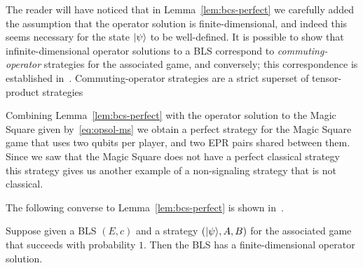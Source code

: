 \begin{remark}
The reader will have noticed that in Lemma~\ref{lem:bcs-perfect} we carefully added the assumption that the operator solution is finite-dimensional, and indeed this seems necessary for the state $|\psi\rangle$ to be well-defined. It is possible to show that infinite-dimensional operator solutions to a BLS correspond to \emph{commuting-operator} strategies for the associated game, and conversely; this correspondence is established in~\cite{cleve2017perfect}. Commuting-operator strategies are a strict superset of tensor-product strategies  
\end{remark}

Combining Lemma~\ref{lem:bcs-perfect} with the operator solution to the Magic Square given by~\eqref{eq:opsol-ms} we obtain a perfect strategy for the Magic Square game that uses two qubits per player, and two EPR pairs shared between them. Since we saw that the Magic Square does not have a perfect classical strategy this strategy gives us another example of a non-signaling strategy that is not classical. 

The following converse to Lemma~\ref{lem:bcs-perfect} is shown in~\cite{cleve2014characterization}. 

\begin{lemma}\label{lem:bcs-tensor}
Suppose given a BLS $(E,c)$ and a strategy $(|\psi\rangle,A,B)$ for the associated game that succeeds with probability $1$. Then the BLS has a finite-dimensional operator solution. 
\end{lemma}

